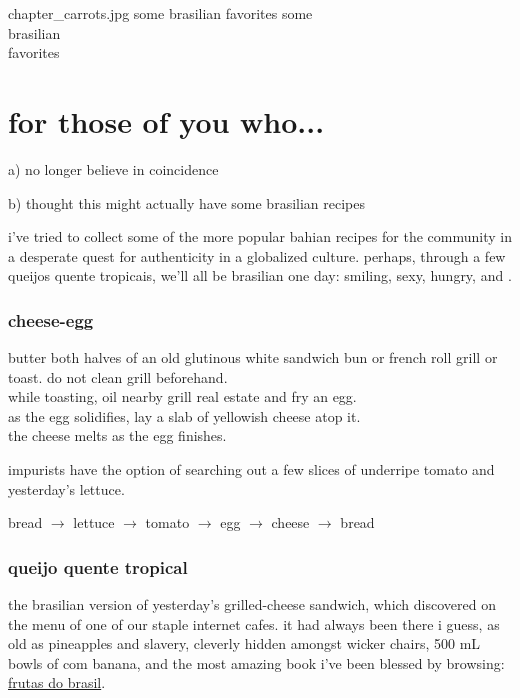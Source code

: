 \mychapter
{chapter_carrots.jpg}
{some brasilian favorites}
{some\\brasilian{}\\favorites}

\section{for those of you who...}

\begin{algorithm}
  \item[a)] no longer believe in coincidence
  \item[b)] thought this might actually have some brasilian recipes
\end{algorithm}

i've tried to collect some of the more popular bahian recipes for the
 community in a desperate quest for authenticity in a globalized
culture. perhaps, through a few queijos quente tropicais, we'll all be
brasilian one day: smiling, sexy, hungry, and .

\subsubsection{cheese-egg}

butter both halves of an old glutinous white sandwich bun or french
roll grill or toast. do not clean grill beforehand.\\
while toasting, oil nearby grill real estate and fry an egg.\\
as the egg solidifies, lay a slab of yellowish cheese atop it.\\
the cheese melts as the egg finishes.

impurists have the option of searching out a few slices of underripe
tomato and yesterday's lettuce.

bread $\rightarrow$ lettuce $\rightarrow$ tomato $\rightarrow$ egg
$\rightarrow$ cheese $\rightarrow$ bread

\subsubsection{queijo quente tropical}

the brasilian version of yesterday's grilled-cheese sandwich, which
 discovered on the menu of one of our staple internet cafes. it
had always been there i guess, as old as pineapples and slavery,
cleverly hidden amongst wicker chairs, 500 mL bowls of
 com banana, and the most amazing book i've been blessed by
browsing: \underline{\gls{frutas do brasil}}.

